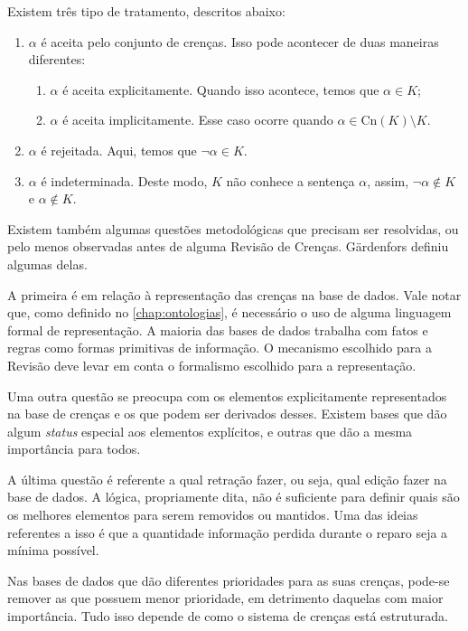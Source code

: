 Existem três tipo de tratamento, descritos abaixo:

\begin{enumerate}
	\item $ \alpha $ é aceita pelo conjunto de crenças. Isso pode acontecer de duas maneiras diferentes:
	\begin{enumerate}
		\item $ \alpha $ é aceita explicitamente. Quando isso acontece, temos que $ \alpha \in K $;
		\item $ \alpha $ é aceita implicitamente. Esse caso ocorre quando $ \alpha \in \text{Cn}(K) \setminus K $.
	\end{enumerate}
	\item $ \alpha $ é rejeitada. Aqui, temos que $ \lnot \alpha \in K $. 
	\item $ \alpha $ é indeterminada. Deste modo, $ K $ não conhece a sentença $ \alpha $, assim, $ \lnot \alpha \notin K $ e $ \alpha \notin K $.
\end{enumerate}

Existem também algumas questões metodológicas que precisam ser resolvidas, ou pelo menos observadas antes de alguma Revisão de Crenças. Gärdenfors \cite{revisaoGardenfors2} definiu algumas delas.

A primeira é em relação à representação das crenças na base de dados. Vale notar que, como definido no \autoref{chap:ontologias}, é necessário o uso de alguma linguagem formal de representação. A maioria das bases de dados trabalha com fatos e regras como formas primitivas de informação. O mecanismo escolhido para a Revisão deve levar em conta o formalismo escolhido para a representação.

Uma outra questão se preocupa com os elementos explicitamente representados na base de crenças e os que podem ser derivados desses. Existem bases que dão algum \textit{status} especial aos elementos explícitos, e outras que dão a mesma importância para todos. 

A última questão é referente a qual retração fazer, ou seja, qual edição fazer na base de dados. A lógica, propriamente dita, não é suficiente para definir quais são os melhores elementos para serem removidos ou mantidos. Uma das ideias referentes a isso é que a quantidade informação perdida durante o reparo seja a mínima possível. 

Nas bases de dados que dão diferentes prioridades para as suas crenças, pode-se remover as que possuem menor prioridade, em detrimento daquelas com maior importância. Tudo isso depende de como o sistema de crenças está estruturada.

